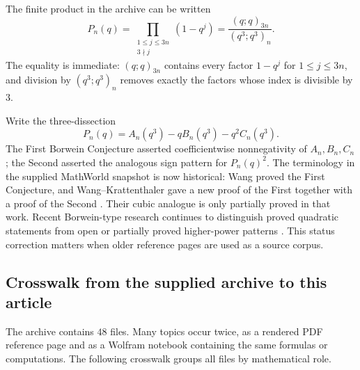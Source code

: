 \documentclass[11pt,oneside]{article}
\theoremstyle{definition}
\begin{document}
The finite product in the archive can be written
\begin{equation}\label{eq:borwein-polynomial}
 P_n(q)=\prod_{\substack{1\le j\le3n\\3\nmid j}}(1-q^j)
 =\frac{(q;q)_{3n}}{(q^3;q^3)_n}.
\end{equation}
The equality is immediate: $(q;q)_{3n}$ contains every factor
$1-q^j$ for $1\le j\le3n$, and division by $(q^3;q^3)_n$ removes exactly
the factors whose index is divisible by $3$.

Write the three-dissection
\begin{equation}\label{eq:borwein-dissection}
 P_n(q)=A_n(q^3)-qB_n(q^3)-q^2C_n(q^3).
\end{equation}
The First Borwein Conjecture asserted coefficientwise nonnegativity of
$A_n,B_n,C_n$; the Second asserted the analogous sign pattern for
$P_n(q)^2$.  The terminology in the supplied MathWorld snapshot is now
historical: Wang proved the First Conjecture, and Wang--Krattenthaler gave a
new proof of the First together with a proof of the Second
\cite{Wang2022,WangKrattenthaler2022}.  Their cubic analogue is only partially
proved in that work.  Recent Borwein-type research continues to distinguish
proved quadratic statements from open or partially proved higher-power
patterns \cite{BerkovichDhar2024}.  This status correction matters when older
reference pages are used as a source corpus.

\subsection{Crosswalk from the supplied archive to this article}

The archive contains $48$ files.  Many topics occur twice, as a rendered PDF
reference page and as a Wolfram notebook containing the same formulas or
computations.  The following crosswalk groups all files by mathematical role.
\end{document}
